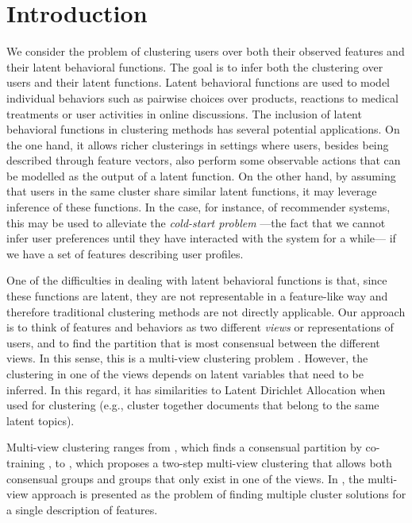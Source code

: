 \documentclass[smallextended]{svjour3}          %
\begin{document}
\section{Introduction}\label{sec:introduction}
We consider the problem of clustering users over both their observed features and their latent behavioral functions. The goal is to infer both the clustering over users and their latent functions. Latent behavioral functions are used to model individual behaviors such as pairwise choices over products, reactions to medical treatments or user activities in online discussions. 
The inclusion of latent behavioral functions in clustering methods has several potential applications. On the one hand, it allows richer clusterings in settings where users, besides being described through feature vectors, also perform some observable actions that can be modelled as the output of a latent function. On the other hand, by assuming that users in the same cluster share similar latent functions, it may leverage inference of these functions. In the case, for instance, of recommender systems, this may be used to alleviate the \textit{cold-start problem} ---the fact that we cannot infer user preferences until they have interacted with the system for a while--- if we have a set of features describing user profiles.

One of the difficulties in dealing with latent behavioral functions is that, since these functions are latent, they are not representable in a feature-like way and therefore traditional clustering methods are not directly applicable.
Our approach is to think of features and behaviors as two different \textit{views} or representations of users, and to find the partition that is most consensual between the different views. In this sense, this is a multi-view clustering problem \citep{SteffenandTobiasScheffer}. However, the clustering in one of the views depends on latent variables that need to be inferred. In this regard, it has similarities to Latent Dirichlet Allocation when used for clustering (e.g., cluster together documents that belong to the same latent topics).

Multi-view clustering ranges from \cite{Kumar2011}, which finds a consensual partition by co-training \citep{Mitchell1998}, to \cite{Greene2009a}, which proposes a two-step multi-view clustering that allows both consensual groups and groups that only exist in one of the views. In \cite{Niu2012}, the multi-view approach is presented as the problem of finding multiple cluster solutions for a single description of features.
\end{document}
